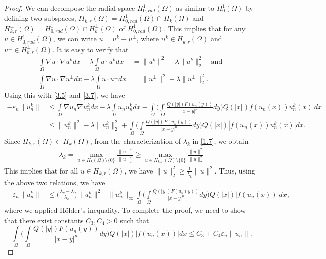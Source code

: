 \documentclass[11pt]{amsart}
\numberwithin{equation}{section}
\newcommand{\h}{H^1_0(\Omega)}
\newcommand{\hr}{H^1_{0, rad}(\Omega)}
\newcommand{\1}{\frac{1}{2}}
\begin{document}
\begin{proof}
		We can decompose the radial space $\hr$ as similar to $\h$ by defining two subspaces, $H_{k,r}(\Omega) = \hr \cap H_k(\Omega)$ and $H^{\perp}_{k,r}(\Omega) = \hr \cap H^\perp_k(\Omega)$  of $\hr$. This implies that for any $u \in \hr$, we can write $u= u^k+ u^\perp$, where $u^k \in H_{k,r}(\Omega)$ and $u^\perp \in H^\perp_{k,r}(\Omega)$. It is easy to verify that 
		\begin{align}
			\int\limits_\Omega \nabla u \cdot \nabla u^k dx - \lambda \int\limits_\Omega u \cdot u^k dx &= \|u^k\|^2 - \lambda \|u^k\|^2_2 ~~~\text{ and } \label{3.7}\\
			\int\limits_\Omega \nabla u \cdot \nabla u^\perp dx - \lambda \int\limits_\Omega u \cdot u^\perp dx &= \|u^\perp\|^2 - \lambda \|u^\perp\|^2_2 \label{3.8}.
		\end{align}
		Using this with \eqref{3.5} and \eqref{3.7}, we have 
		\begin{align}
			-\varepsilon_n\|u_n^k\| &\leq \int\limits_\Omega \nabla u_n \nabla u_n^k dx - \lambda \int\limits_\Omega u_n u_n^k dx - \int\limits_\Omega \Bigg( \int\limits_\Omega \frac{Q(|y|)F(u_n(y))}{|x-y|^\mu} dy\Bigg) Q(|x|)f(u_n(x)) u_n^k(x)\ dx \nonumber\\
			& \leq \|u^k_n\|^2 - \lambda \|u^k_n\|^2_2 + \int\limits_\Omega \Bigg( \int\limits_\Omega \frac{Q(|y|)F(u_n(y))}{|x-y|^\mu} dy\Bigg)Q(|x|) \left|f(u_n(x)) u_n^k(x) \right| dx. \nonumber
		\end{align}
		Since $H_{k,r}(\Omega) \subset H_k(\Omega)$, from the characterization of $\lambda_k$ in \eqref{1.7}, we obtain
		\begin{align*}
			\lambda_k = \max_{u\in H_k(\Omega) \setminus \{0\}} \frac{\|u\|^2}{\|u\|_2^2} \geq \max_{u\in H_{k,r}(\Omega) \setminus \{0\}} \frac{\|u\|^2}{\|u\|_2^2}
		\end{align*} 
		This implies that for all $u\in H_{k,r}(\Omega)$, we have $\displaystyle\|u\|_2^2 \geq \frac{1}{\lambda_k} \|u\|^2$. Thus, using the above two relations, we have
		\begin{align}
			-\varepsilon_n\|u_n^k\|& \leq \Bigg(\frac{\lambda_k -\lambda}{\lambda_k}\Bigg) \|u_n^k\|^2 + \|u_n^k\|_\infty \int\limits_\Omega \Bigg( \int\limits_\Omega \frac{Q(|y|)F(u_n(y))}{|x-y|^\mu} dy\Bigg) Q(|x|)|f(u_n(x))| dx, \label{3.10}
		\end{align}
		where we applied H\"older's inequality. To complete the proof, we need to show that there exist constants $C_3, C_4 >0$ such that
		\begin{equation}
			\int\limits_\Omega \Bigg( \int\limits_\Omega \frac{Q(|y|)F(u_n(y))}{|x-y|^\mu} dy\Bigg) Q(|x|)|f(u_n(x))| dx \leq C_3 + C_4 \varepsilon_n \|u_n\|. \label{3.11}

\end{equation}
\end{proof}
\end{document}
